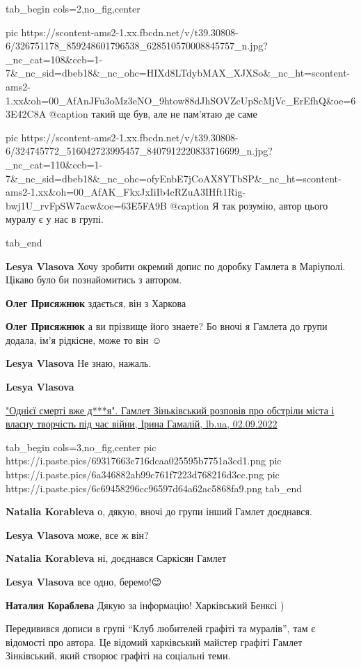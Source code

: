 

\ifcmt
  tab_begin cols=2,no_fig,center

    pic https://scontent-ams2-1.xx.fbcdn.net/v/t39.30808-6/326751178_859248601796538_628510570008845757_n.jpg?_nc_cat=108&ccb=1-7&_nc_sid=dbeb18&_nc_ohc=HIXd8LTdybMAX_XJXSo&_nc_ht=scontent-ams2-1.xx&oh=00_AfAnJFu3oMz3eNO_9htow88dJhSOVZcUpScMjVc_ErEfhQ&oe=63E42C8A
    @caption такий ще був, але не пам'ятаю де саме

    pic https://scontent-ams2-1.xx.fbcdn.net/v/t39.30808-6/324745772_516042723995457_8407912220833716699_n.jpg?_nc_cat=110&ccb=1-7&_nc_sid=dbeb18&_nc_ohc=ofyEnbE7jCoAX8YTbSP&_nc_ht=scontent-ams2-1.xx&oh=00_AfAK_FkxJxIiIb4cRZuA3IHft1Rig-bwj1U_rvFpSW7acw&oe=63E5FA9B
    @caption Я так розумію, автор цього муралу є у нас в групі.

  tab_end
\fi

\begin{itemize} %
\textbf{Lesya Vlasova} Хочу зробити окремий допис по доробку Гамлета в Маріуполі. Цікаво було би познайомитись з автором.

\textbf{Олег Присяжнюк} здається, він з Харкова

\textbf{Олег Присяжнюк} а ви прізвище його знаете? Бо вночі я Гамлета до групи додала, ім'я рідкісне, може то він ☺️

\textbf{Lesya Vlasova} Не знаю, нажаль.

\textbf{Lesya Vlasova} 

\href{https://lb.ua/culture/2022/09/02/528211_odniiei_smerti_vzhe_dya_gamlet.html}{%
"Однієї смерті вже д***я". Гамлет Зіньківський розповів про обстріли міста і власну творчість під час війни, %
Ірина Гамалій, lb.ua, 02.09.2022%
}

\ifcmt
  tab_begin cols=3,no_fig,center
     pic https://i.paste.pics/69317663c716dcaa025595b7751a3cd1.png
		 pic https://i.paste.pics/6a346882ab99c761f7223d768216d3cc.png
     pic https://i.paste.pics/6c69458296cc96597d64a62ac5868fa9.png
  tab_end
\fi

\begin{itemize} %
\textbf{Natalia Korableva} о, дякую, вночі до групи інший Гамлет доєднався.

\textbf{Lesya Vlasova} може, все ж він?

\textbf{Natalia Korableva} ні, доєднався Саркісян Гамлет

\textbf{Lesya Vlasova} все одно, беремо!😉

\textbf{Наталия Кораблева} Дякую за інформацію! Харківський Бенксі )
\end{itemize} %


Передивився дописи в групі \enquote{Клуб любителей графіті та муралів}, там є відомості
про автора. Це відомий харківський майстер графіті Гамлет Зінківський, який
створює графіті на соціальні теми.

\end{itemize} %


